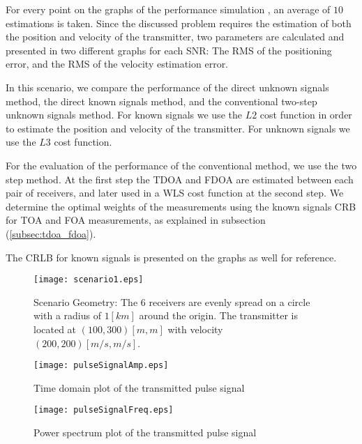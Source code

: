 For every point on the graphs of the performance simulation , an average of $10$ estimations is taken.
Since the discussed problem requires the estimation of both the position and velocity of the transmitter, two parameters are calculated and presented in two different graphs for each SNR: The RMS of the positioning error, and the RMS of the velocity estimation error.

In this scenario, we compare the performance of the direct unknown signals method, the direct known signals method, and the conventional two-step unknown signals method.
For known signals we use the $L2$ cost function in order to estimate the position and velocity of the transmitter. For unknown signals we use the $L3$ cost function.

For the evaluation of the performance of the conventional method, we use the two step method.
At the first step the TDOA and FDOA are estimated between each pair of receivers, and later used in a WLS cost function at the second step. We determine the optimal weights of the measurements using the known signals CRB for TOA and FOA measurements, as explained in subsection (\ref{subsec:tdoa_fdoa}).

The CRLB for known signals is presented on the graphs as well for reference.

\begin{figure}
\begin{center}
\texttt{[image: scenario1.eps]} 
\end{center}
\caption{Scenario Geometry: The 6 receivers are evenly spread on a circle with a radius of $1[km]$ around the origin. The transmitter is located at $(100,300)[m,m]$ with velocity $(200,200)[m/s,m/s]$.}
\label{fig:scenario1_geometry}
\end{figure}


\begin{figure}
\begin{center}
\texttt{[image: pulseSignalAmp.eps]} 
\end{center}
\caption{Time domain plot of the transmitted pulse signal}
\label{fig:pulseSignalAmp}
\end{figure}

\begin{figure}
\begin{center}
\texttt{[image: pulseSignalFreq.eps]} 
\end{center}
\caption{Power spectrum plot of the transmitted pulse signal}
\label{fig:pulseSignalFreq}
\end{figure}

